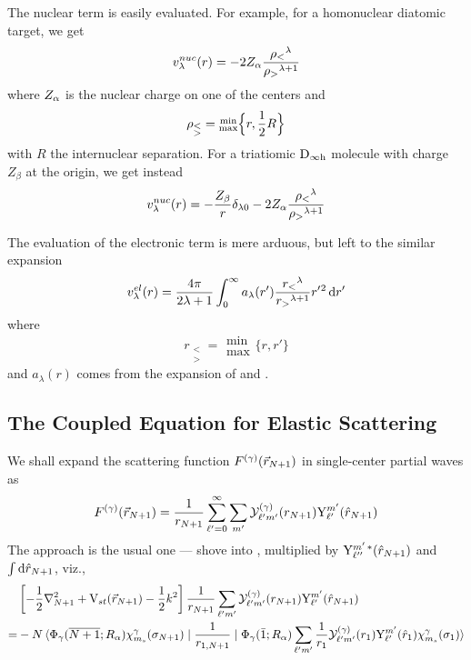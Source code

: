 \documentclass[aps,pra,groupedaddress,12pt,
               amsfonts,amssymb,
               preprint
    ]{revtex4}
\begin{document}
The nuclear term is easily evaluated. For example, for a homonuclear
diatomic target, we get 
\begin{equation}
  \label{eq:vlamn}
  v_\lambda^{nuc}(r) = -2Z_\alpha\dfrac{\rho_{<}{}^{\lambda}}{\rho_{>}{}^{\lambda+1}}
\end{equation}
where $Z_\alpha$ is the nuclear charge on one of the centers and 
\begin{equation}
  \label{eq:rmR}
  \rho_{\substack{< \\ >}} = \substack{\min \\ \max}\Big\{r,\dfrac{1}{2}R\Big\}
\end{equation}
with $R$ the internuclear separation. For a triatiomic $\mathrm{D}_{\infty\text{h}}$ molecule
with charge $Z_\beta$ at the origin, we get instead
\begin{equation}
  \label{eq:vlamnt}
  v_\lambda^{nuc}(r) = -\dfrac{Z_\beta}{r}\delta_{\lambda 0}
            -2Z_\alpha\dfrac{\rho_{<}{}^{\lambda}}{\rho_{>}{}^{\lambda+1}}
\end{equation}

The evaluation of the electronic term is mere arduous, but left to the
similar expansion
\begin{equation}
  \label{eq:vlame}
  v_\lambda^{el}(r) =
  \dfrac{4\pi}{2\lambda+1}\int_0^{\infty}a_\lambda(r')
  \dfrac{r_{<}{}^{\lambda}}{r_{>}{}^{\lambda+1}}r'{}^2\,\mathrm{d} r'
\end{equation}
where
\begin{equation}
  \label{eq:rmr}
  r_{\substack{< \\ >}} = \substack{\min \\ \max}\big\{r,r'\big\}
\end{equation}
and $a_\lambda(r)$ comes from the expansion of  and .

\subsection{The Coupled Equation for Elastic Scattering}
\label{sec:coupl-equat-elast}
We shall expand the scattering function $F^{(\gamma)}(\vec{r}_{N+1})$ in single-center
partial waves as
\begin{equation}
  \label{eq:sofnel}
  F^{(\gamma)}(\vec{r}_{N+1}) = \dfrac{1}{r_{N+1}}\sum_{\ell'=0}^{\infty}\sum_{m'}\mathcal{Y}_{\ell'm'}^{(\gamma)}(r_{N+1})\mathrm{Y}_{\ell'}^{m'}(\hat{r}_{N+1})
\end{equation}
The approach is the usual one --- shove  into ,
multiplied by $\mathrm{Y}_{\ell''}^{m'\,*}(\hat{r}_{N+1})$ and $\int\mathrm{d}\hat{r}_{N+1}$, viz.,
\begin{equation}
  \label{eq:essca}
    \begin{split}
    &\left[-\dfrac{1}{2}\nabla^2_{N+1}+\mathrm{V}_{st}(\vec{r}_{N+1})-\dfrac{1}{2}k^2\right]
    \dfrac{1}{r_{N+1}}\sum_{\ell'm'}\mathcal{Y}_{\ell'm'}^{(\gamma)}(r_{N+1})\mathrm{Y}_{\ell'}^{m'}(\hat{r}_{N+1}) \\
    =&-N\mathinner{\langle{{\Phi_\gamma(\overline{N+1};R_\alpha)\chi_{m_s}^{\gamma}(\sigma_{N+1})} \mid {\dfrac{1}{r_{1,N+1}}} \mid {\Phi_\gamma(\bar{1};R_\alpha)\sum_{\ell'm'}\dfrac{1}{r_1}\mathcal{Y}_{\ell'm'}^{(\gamma)}(r_1)\mathrm{Y}_{\ell'}^{m'}(\hat{r}_1)\chi_{m_s}^{\gamma}(\sigma_1)}}\rangle}
  \end{split}
\end{equation}
\end{document}
